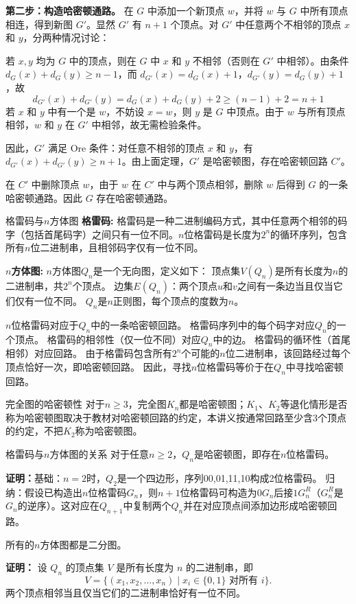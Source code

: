 \documentclass[lang=cn,11pt]{elegantbook}
\begin{document}
    \textbf{第二步：构造哈密顿通路。}
    在 $G$ 中添加一个新顶点 $w$，并将 $w$ 与 $G$ 中所有顶点相连，得到新图 $G'$。显然 $G'$ 有 $n+1$ 个顶点。对 $G'$ 中任意两个不相邻的顶点 $x$ 和 $y$，分两种情况讨论：
         
    若 $x, y$ 均为 $G$ 中的顶点，则在 $G$ 中 $x$ 和 $y$ 不相邻（否则在 $G'$ 中相邻）。由条件 $d_G(x) + d_G(y) \ge n-1$，而 $d_{G'}(x) = d_G(x) + 1$，$d_{G'}(y) = d_G(y) + 1$，故
        \[
        d_{G'}(x) + d_{G'}(y) = d_G(x) + d_G(y) + 2 \ge (n-1) + 2 = n+1
        \]
         若 $x$ 和 $y$ 中有一个是 $w$，不妨设 $x = w$，则 $y$ 是 $G$ 中顶点。由于 $w$ 与所有顶点相邻，$w$ 和 $y$ 在 $G'$ 中相邻，故无需检验条件。

    因此，$G'$ 满足 Ore 条件：对任意不相邻的顶点 $x$ 和 $y$，有 $d_{G'}(x) + d_{G'}(y) \ge n+1$。由上面定理，$G'$ 是哈密顿图，存在哈密顿回路 $C'$。

    在 $C'$ 中删除顶点 $w$，由于 $w$ 在 $C'$ 中与两个顶点相邻，删除 $w$ 后得到 $G$ 的一条哈密顿通路。因此 $G$ 存在哈密顿通路。
\begin{definition}{格雷码与$n$方体图}
\textbf{格雷码:}
格雷码是一种二进制编码方式，其中任意两个相邻的码字（包括首尾码字）之间只有一位不同。$n$位格雷码是长度为$2^n$的循环序列，包含所有$n$位二进制串，且相邻码字仅有一位不同。

\textbf{$n$方体图:}
$n$方体图$Q_n$是一个无向图，定义如下：
顶点集$V(Q_n)$是所有长度为$n$的二进制串，共$2^n$个顶点。  
边集$E(Q_n)$：两个顶点$u$和$v$之间有一条边当且仅当它们仅有一位不同。  
$Q_n$是$n$正则图，每个顶点的度数为$n$。
\end{definition}
$n$位格雷码对应于$Q_n$中的一条哈密顿回路。
格雷码序列中的每个码字对应$Q_n$的一个顶点。  
格雷码的相邻性（仅一位不同）对应$Q_n$中的边。  
格雷码的循环性（首尾相邻）对应回路。  
由于格雷码包含所有$2^n$个可能的$n$位二进制串，该回路经过每个顶点恰好一次，即哈密顿回路。  
因此，寻找$n$位格雷码等价于在$Q_n$中寻找哈密顿回路。
\begin{theorem}{完全图的哈密顿性}
    对于$n\geqslant3$，完全图$K_n$都是哈密顿图；$K_1$、$K_2$等退化情形是否称为哈密顿图取决于教材对哈密顿回路的约定，本讲义按通常回路至少含3个顶点的约定，不把$K_2$称为哈密顿图。
\end{theorem}
\begin{theorem}{格雷码与$n$方体图的关系}
    对于任意$n \geqslant 2$，$Q_n$是哈密顿图，即存在$n$位格雷码。
\end{theorem}
\textbf{证明：}基础：$n=2$时，$Q_2$是一个四边形，序列00,01,11,10构成2位格雷码。  
归纳：假设已构造出$n$位格雷码$G_n$，则$n+1$位格雷码可构造为$0G_n$后接$1G_n^R$（$G_n^R$是$G_n$的逆序）。这对应在$Q_{n+1}$中复制两个$Q_n$并在对应顶点间添加边形成哈密顿回路。
\begin{theorem}
    所有的$n$方体图都是二分图。
\end{theorem}
\textbf{证明：}
    设 $Q_n$ 的顶点集 $V$ 是所有长度为 $n$ 的二进制串，即
    \[
    V = \{ (x_1, x_2, \dots, x_n) \mid x_i \in \{0, 1\} \text{ 对所有 } i \}.
    \]
    两个顶点相邻当且仅当它们的二进制串恰好有一位不同。
\end{document}
